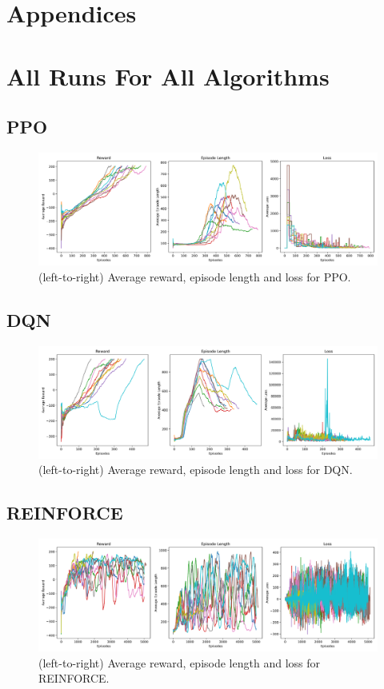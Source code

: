 \documentclass{article}
\begin{document}


\newpage
\section*{Appendices}
\appendix
\section{All Runs For All Algorithms}\label{runs}
\subsection*{PPO}
\begin{figure}[H]
  \centering
  \includegraphics[scale=0.35]{6.png}
  \caption{(left-to-right) Average reward, episode length and loss for PPO.}
\end{figure}
\subsection*{DQN}
\begin{figure}[H]
  \centering
  \includegraphics[scale=0.35]{5.png}
  \caption{(left-to-right) Average reward, episode length and loss for DQN.}
\end{figure}
\subsection*{REINFORCE}
\begin{figure}[H]
  \centering
  \includegraphics[scale=0.35]{4.png}
  \caption{(left-to-right) Average reward, episode length and loss for REINFORCE.}
\end{figure}
\end{document}
